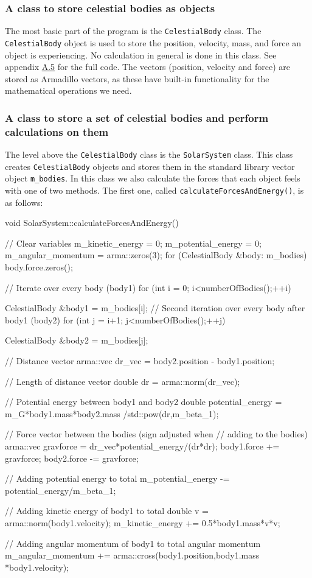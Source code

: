 \documentclass[reprint,english,notitlepage]{revtex4-1}  %
\begin{document}
\subsubsection{A class to store celestial bodies as objects} \label{sec:III:a:1}

The most basic part of the program is the \verb+CelestialBody+ class. The \verb+CelestialBody+ object is used to store the position, velocity, mass, and force an object is experiencing. No calculation in general is done in this class. See appendix \hyperref[A.5]{A.5} for the full code. The vectors (position, velocity and force) are stored as Armadillo \citep{Armadillo} vectors, as these have built-in functionality for the mathematical operations we need.

\subsubsection{A class to store a set of celestial bodies and perform calculations on them} \label{sec:III:a:2}

The level above the \verb+CelestialBody+ class is the \verb+SolarSystem+ class. This class creates \verb+CelestialBody+ objects and stores them in the standard library vector object \verb+m_bodies+. In this class we also calculate the forces that each object feels with one of two methods. The first one, called \verb+calculateForcesAndEnergy()+, is as follows:

\begin{cpp}
void SolarSystem::calculateForcesAndEnergy() {
  // Clear variables
  m_kinetic_energy = 0;
  m_potential_energy = 0;
  m_angular_momentum = arma::zeros(3);
  for (CelestialBody &body: m_bodies) {
    body.force.zeros();
  }

  // Iterate over every body (body1)
  for (int i = 0; i<numberOfBodies();++i){
    CelestialBody &body1 = m_bodies[i];
    // Second iteration over every body after body1 (body2)
    for (int j = i+1; j<numberOfBodies();++j) {
      CelestialBody &body2 = m_bodies[j];

      // Distance vector
      arma::vec dr_vec = body2.position - body1.position;

      // Length of distance vector
      double dr = arma::norm(dr_vec);

      // Potential energy between body1 and body2
      double potential_energy = m_G*body1.mass*body2.mass
      							/std::pow(dr,m_beta_1);

      // Force vector between the bodies (sign adjusted when 
      // adding to the bodies)
      arma::vec gravforce = dr_vec*potential_energy/(dr*dr);
      body1.force += gravforce;
      body2.force -= gravforce;

      // Adding potential energy to total
      m_potential_energy -= potential_energy/m_beta_1;
    }

    // Adding kinetic energy of body1 to total
    double v = arma::norm(body1.velocity);
    m_kinetic_energy += 0.5*body1.mass*v*v;

    // Adding angular momentum of body1 to total angular momentum
    m_angular_momentum += arma::cross(body1.position,body1.mass
    								  *body1.velocity);
  }
}
\end{cpp}
\end{document}
